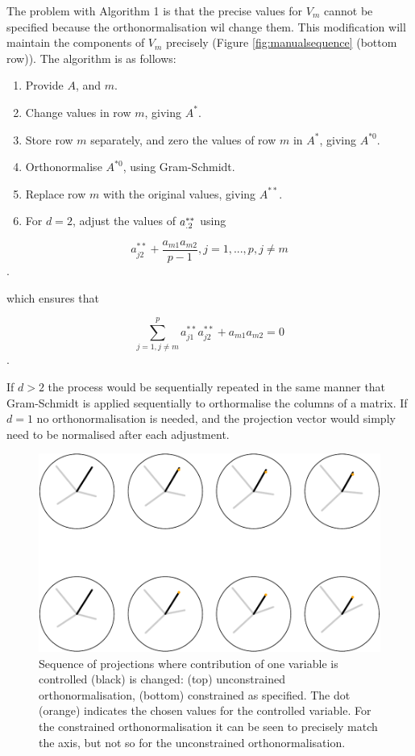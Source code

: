 \documentclass[]{interact}
\theoremstyle{plain}%
\theoremstyle{definition}
\theoremstyle{remark}
\providecommand{\tightlist}{%
  \setlength{\itemsep}{0pt}\setlength{\parskip}{0pt}}
\def\tightlist{}
\begin{document}
The problem with Algorithm 1 is that the precise values for \(V_m\)
cannot be specified because the orthonormalisation wil change them. This
modification will maintain the components of \(V_m\) precisely (Figure
\ref{fig:manualsequence} (bottom row)). The algorithm is as follows:

\begin{enumerate}
\def\labelenumi{\arabic{enumi}.}
\tightlist
\item
  Provide \(A\), and \(m\).
\item
  Change values in row \(m\), giving \(A^*\).
\item
  Store row \(m\) separately, and zero the values of row \(m\) in
  \(A^*\), giving \(A^{*0}\).
\item
  Orthonormalise \(A^{*0}\), using Gram-Schmidt.
\item
  Replace row \(m\) with the original values, giving \(A^{**}\).
\item
  For \(d=2\), adjust the values of \({\boldmath a}^{**}_{.2}\) using
\end{enumerate}

\[a^{**}_{j2}+\frac{a_{m1}a_{m2}}{p-1}, j=1, ..., p, j\neq m\].

which ensures that

\[\sum_{j=1, j\neq m}^p a^{**}_{j1}a^{**}_{j2} + a_{m1}a_{m2} = 0\].

If \(d>2\) the process would be sequentially repeated in the same manner
that Gram-Schmidt is applied sequentially to orthormalise the columns of
a matrix. If \(d=1\) no orthonormalisation is needed, and the projection
vector would simply need to be normalised after each adjustment.

\begin{figure}
\centering
\includegraphics{paper_files/figure-latex/manualsequence-1.pdf}
\caption{Sequence of projections where contribution of one variable is
controlled (black) is changed: (top) unconstrained orthonormalisation,
(bottom) constrained as specified. The dot (orange) indicates the chosen
values for the controlled variable. For the constrained
orthonormalisation it can be seen to precisely match the axis, but not
so for the unconstrained orthonormalisation.}
\end{figure}
\end{document}
